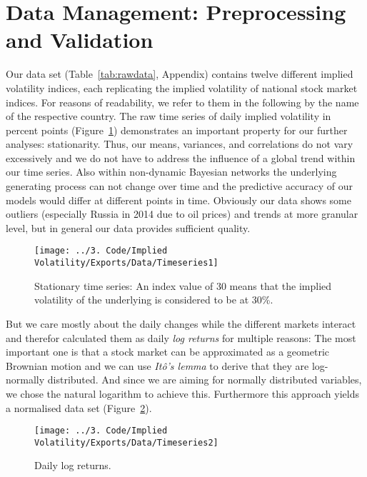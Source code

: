 \documentclass[twoside,twocolumn]{article}
\begin{document}
\section{Data Management: Preprocessing and Validation}
Our data set (Table~\ref{tab:rawdata}, Appendix) contains twelve different implied volatility indices, each replicating the implied volatility of national stock market indices.  For reasons of readability, we refer to them in the following by the name of the respective country. The raw time series of daily implied volatility in percent points (Figure~\ref{fig:timeseriesraw}) demonstrates an important property for our further analyses: stationarity. Thus, our means, variances, and correlations do not vary excessively and we do not have to address the influence of a global trend within our time series. Also within non-dynamic Bayesian networks the underlying generating process can not change over time and the predictive accuracy of our models would differ at different points in time. Obviously our data shows some outliers (especially Russia in 2014 due to oil prices) and trends at more granular level, but in general our data provides sufficient quality. \cite{Glymour2019} \cite{Shumway2017}
\begin{figure}[H]
\centering
  \texttt{[image: ../3. Code/Implied Volatility/Exports/Data/Timeseries1]}
  \caption[Daily Implied Volatility]{Stationary time series: An index value of 30 means that the implied volatility of the underlying is considered to be at 30\%.}
  \label{fig:timeseriesraw}
  \end{figure}
  
But we care mostly about the daily changes while the different markets interact and therefor calculated them as daily \textit{log returns} for multiple reasons: The most important one is that a stock market can be approximated as a geometric Brownian motion and we can use \textit{It\^{o}'s lemma} to derive that they are log-normally distributed. And since we are aiming for normally distributed variables, we chose the natural logarithm to achieve this. Furthermore this approach yields a normalised data set (Figure~\ref{fig:timeseriesdaily}).  \cite{Joshi2008} \cite{Hull2021}



\begin{figure}[H]
\centering
  \texttt{[image: ../3. Code/Implied Volatility/Exports/Data/Timeseries2]}
\caption[Change of daily Implied Volatility]{Daily log returns. }
  \label{fig:timeseriesdaily}
\end{figure}
\end{document}
